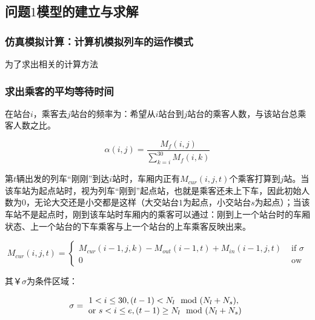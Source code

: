
\subsection{问题$1$模型的建立与求解}

\subsubsection{仿真模拟计算：计算机模拟列车的运作模式}

为了求出相关的计算方法

\subsubsection{求出乘客的平均等待时间}

在站台$i$，乘客去$j$站台的频率为：希望从$i$站台到$j$站台的乘客人数，与该站台总乘客人数之比。

\begin{equation}
\alpha(i, j) = 
	\frac {M_f(i, j)}{\sum _{k = i} ^{30} M_f(i, k)}
\end{equation}

第$t$辆出发的列车“刚刚”到达$i$站时，车厢内正有$M_{cur}(i, j, t)$个乘客打算到$j$站。当该车站为起点站时，视为列车“刚到”起点站，也就是乘客还未上下车，因此初始人数为$0$，无论大交还是小交都是这样（大交站台$1$为起点，小交站台$s$为起点）；当该车站不是起点时，刚到该车站时车厢内的乘客可以通过：刚到上一个站台时的车厢状态、上一个站台的下车乘客与上一个站台的上车乘客反映出来。

\begin{equation}
M_{cur}(i, j, t) = 
	\begin{cases}
	M_{cur}(i - 1, j, k) - M_{out}(i - 1, t) + M_{in}(i - 1, j, t)  & \text{ if }\sigma \\
	0  & \text{ ow }
	\end{cases}
\end{equation}

其$￥\sigma$为条件区域：

\begin{equation}
    \sigma = 
        \begin{matrix}
 		1 < i \leq 30, (t - 1) < N_l \mod (N_l + N_s),  \\
		\text{ or } s < i \leq e, (t - 1) \geq N_l \mod (N_l + N_s)\\
		\end{matrix} \\
\end{equation}

